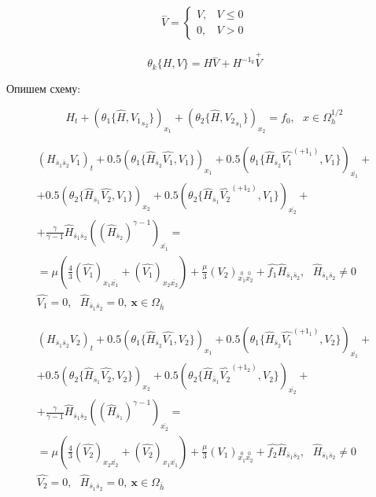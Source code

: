 \documentclass[specialist,subf,href,colorlinks=true,14pt,times,mtpro]{disser}
\newcommand{\bdrv}[1]{_{\overline{#1}}}
\newcommand{\fdrv}[1]{_{#1}}
\newcommand{\ddrv}[1]{_{#1\overline{#1}}}
\newcommand{\doublewdrv}[2]{_{\stackrel{0}{#1}\stackrel{0}{#2}}}
\newcommand{\overp}[1]{{\stackrel{+}{#1}}}
\newcommand{\overm}[1]{{\stackrel{-}{#1}}}
\newcommand{\avgbwdc}[0]{_{\overline{s}_1 \overline{s}_2}}
\newcommand{\avgbwdx}[0]{_{\overline{s}_1}}
\newcommand{\avgbwdy}[0]{_{\overline{s}_2}}
\begin{document}
$$
\overm{V} = \begin{cases}
V, & V \leqslant 0 \\
0, & V > 0
\end{cases}
$$

$$
\theta_k\{H, V\} = H\overm{V} + H^{-1_k}\overp{V}
$$

Опишем схему:

\begin{equation}
H_t + (\theta_1\{\hat{H}, {V_1}_{s_2}\})\fdrv{x_1} + (\theta_2\{\hat{H}, {V_2}_{s_1}\})\fdrv{x_2} = f_0,\ \ \  x \in \Omega_h^{1/2}
\end{equation}

\begin{equation}
\begin{array}{l}
(H\avgbwdc V_1)_t + 0.5(\theta_1\{\hat{H}\avgbwdy\hat{V_1}, V_1\})\fdrv{x_1} + 0.5(\theta_1\{\hat{H}\avgbwdy \hat{V_1}^{(+1_1)}, V_1\})\bdrv{x_1} + \\
+ 0.5(\theta_2\{\hat{H}\avgbwdx \hat{V_2}, V_1\})\fdrv{x_2} + 0.5(\theta_2\{\hat{H}\avgbwdx \hat{V_2}^{(+1_2)}, V_1 \} )\bdrv{x_2} + \\
+ \frac{\gamma}{\gamma - 1} \hat{H}\avgbwdc((\hat{H}\avgbwdy)^{\gamma - 1})\bdrv{x_1} = \\
=  \mu \left(\frac{4}{3} (\hat{V_1})\ddrv{x_1} + (\hat{V_1})\ddrv{x_2}\right) + \frac{\mu}{3}(V_2)\doublewdrv{x_1}{x_2} + \hat{f_1}\hat{H}\avgbwdc,\ \ \ \hat{H}\avgbwdc \ne 0 \\

\hat{V_1} = 0,\ \ \ \hat{H}\avgbwdc = 0,\  \textbf{x} \in \Omega\bdrv{h}
\end{array}
\end{equation}

\begin{equation}
\begin{array}{l}
(H\avgbwdc V_2)_t + 0.5(\theta_1\{\hat{H}\avgbwdy\hat{V_1}, V_2\})\fdrv{x_1} + 0.5(\theta_1\{\hat{H}\avgbwdy \hat{V_1}^{(+1_1)}, V_2\})\bdrv{x_1} + \\
+ 0.5(\theta_2\{\hat{H}\avgbwdx \hat{V_2}, V_2\})\fdrv{x_2} + 0.5(\theta_2\{\hat{H}\avgbwdx \hat{V_2}^{(+1_2)}, V_2 \} )\bdrv{x_2} + \\
+ \frac{\gamma}{\gamma - 1} \hat{H}\avgbwdc((\hat{H}\avgbwdx)^{\gamma - 1})\bdrv{x_2} = \\
=  \mu \left(\frac{4}{3} (\hat{V_2})\ddrv{x_2} + (\hat{V_2})\ddrv{x_1}\right) + \frac{\mu}{3}(V_1)\doublewdrv{x_1}{x_2} + \hat{f_2}\hat{H}\avgbwdc,\ \ \ \hat{H}\avgbwdc \ne 0 \\

\hat{V_2} = 0,\ \ \ \hat{H}\avgbwdc = 0,\  \textbf{x} \in \Omega\bdrv{h}
\end{array}
\end{equation}
\end{document}
